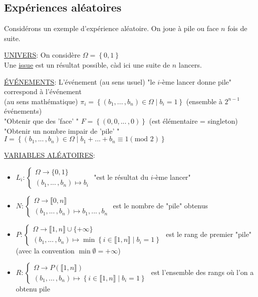 \documentclass[10pt,a4paper]{article}
\theoremstyle{definition}
\begin{document}
\subsection{Expériences aléatoires}
\noindent Considérons un exemple d'expérience aléatoire. On joue à pile ou face $n$ fois de suite. \medskip

\noindent \uline{UNIVERS}: On considère $\Omega = \left\{ 0, 1 \right\}$ \\
Une \uline{issue} est un résultat possible, càd ici une suite de $n$ lancers. \medskip

\noindent \uline{ÉVÉNEMENTS}: L'événement (au sens usuel) "le $i$-ème lancer donne pile" correspond à l'événement \\
(au sens mathématique) $\pi_i = \left\{(b_1, ...\,, b_n) \in \Omega \mid b_i = 1 \right\}$ (ensemble à $2^{n - 1}$ événements)\\
"Obtenir que des 'face' " $F = \left\{ (0, 0, ...\,, 0) \right\}$ (est élémentaire = singleton) \\
"Obtenir un nombre impair de 'pile' " $I = \left\{ (b_1, ...\,, b_n) \in \Omega \mid b_1 + ... + b_n \equiv 1 (\text{mod } 2) \right\}$ \medskip

\noindent \uline{VARIABLES ALÉATOIRES}:
\begin{itemize}
\item $L_i : \begin{cases}
\Omega \to \{ 0, 1 \} \\
(b_1, ...\,, b_n) \mapsto b_i
\end{cases}$ "est le résultat du $i$-ème lancer"
\item $N : \begin{cases}
\Omega \to \llbracket 0, n \rrbracket \\
(b_1, ...\,, b_n) \mapsto b_1, ...\,, b_n
\end{cases}$ est le nombre de "pile" obtenus
\item $P: \begin{cases}
\Omega \to \llbracket 1, n \rrbracket \cup \{ +\infty \} \\
(b_1, ...\,, b_n) \mapsto \min\left\{ i \in \llbracket 1, n \rrbracket \mid b_i = 1 \right\}
\end{cases}$ est le rang de premier "pile" \\
(avec la convention $\min \emptyset = +\infty$)
\item $R: \begin{cases}
\Omega \to P(\llbracket 1, n \rrbracket) \\
(b_1, ...\,, b_n) \mapsto \left\{ i \in \llbracket 1, n \rrbracket \mid b_i = 1 \right\}
\end{cases}$ est l'ensemble des rangs où l'on a obtenu pile
\end{itemize} \medskip
\end{document}
